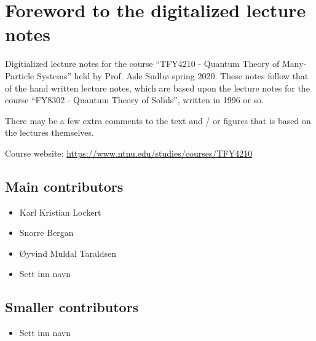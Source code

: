 \section*{Foreword to the digitalized lecture notes}

Digitialized lecture notes for the course ``TFY4210 - Quantum Theory of Many-Particle Systems'' held by Prof. Asle Sudbø spring 2020. These notes follow that of the hand written lecture notes, which are based upon the lecture notes for the course ``FY8302 - Quantum Theory of Solids'', written in 1996 or so. 

There may be a few extra comments to the text and / or figures that is based on the lectures themselves. 


Course website: \href{https://www.ntnu.edu/studies/courses/TFY4210}{https://www.ntnu.edu/studies/courses/TFY4210}



\subsection*{Main contributors}
	\begin{multicols}{2}
\begin{itemize} 
	\item Karl Kristian Lockert
	\item Snorre Bergan
	\item Øyvind Muldal Taraldsen
	\item {\color{red} Sett inn navn }
\end{itemize}
\end{multicols}

\subsection*{Smaller contributors}
\begin{multicols}{2}
\begin{itemize}
	\item {\color{red} Sett inn navn }
\end{itemize}
\end{multicols}


